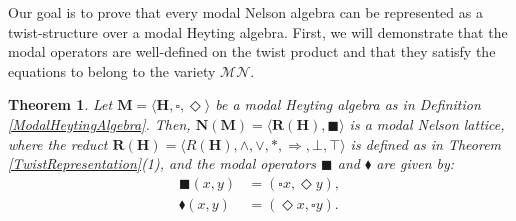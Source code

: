 \documentclass[pdflatex,sn-mathphys-num]{sn-jnl}%
\newcommand{\RH}[1]{\mathbf{R}(#1)}
\newcommand{\He}{\mathbf{H}}
\newcommand{\To}{\Rightarrow}
\theoremstyle{thmstyleone}%
\newtheorem{theorem}{Theorem}%
\theoremstyle{thmstyletwo}%
\theoremstyle{thmstylethree}%
\begin{document}
Our goal is to prove that every modal Nelson algebra can be represented as a twist-structure over a modal Heyting algebra. First, we will demonstrate that the modal operators are well-defined on the twist product and that they satisfy the equations to belong to the variety $\mathcal{MN}$.


\begin{theorem} \label{ModalHeyToModalNelson}
Let $\mathbf{M}=\langle \He,\square,\Diamond\rangle$ be a modal Heyting algebra as in Definition \ref{ModalHeytingAlgebra}. Then, $\mathbf{N}(\mathbf{M})=\langle \RH{\mathbf{H}},\blacksquare\rangle$ is a modal Nelson lattice, where the reduct $\RH{\mathbf{H}}=\langle R(\mathbf{H}),\wedge,\vee, *, \To,\bot,\top\rangle$
is defined as in Theorem \ref{TwistRepresentation}(1), and the modal operators $\blacksquare$ and $\blacklozenge$ are given by:
\begin{align}
    \blacksquare(x,y) &= (\square x, \Diamond y), \\  
    \blacklozenge(x,y) &= (\Diamond x, \square y).
\end{align}
\end{theorem}
\end{document}
